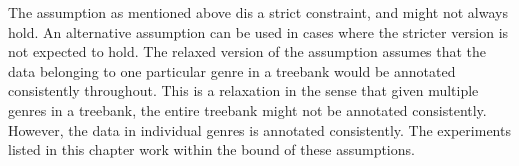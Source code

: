 The assumption as mentioned above dis a strict constraint, and might not always hold. An alternative assumption can be used in cases where the stricter version is not expected to hold. The relaxed version of the assumption assumes that the data belonging to one particular genre in a treebank would be annotated consistently throughout. This is a relaxation in the sense that given multiple genres in a treebank, the entire treebank might not be annotated consistently. However, the data in individual genres is annotated consistently. The experiments listed in this chapter work within the bound of these assumptions. 


